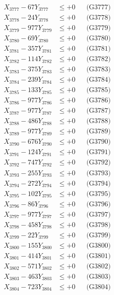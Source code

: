 \documentclass[a4paper,10pt]{article}
\begin{document}
{\begin{align}
X_{3777} - 67Y_{3777} &\leq +0 && \text{(G3777)} \\
X_{3778} - 24Y_{3778} &\leq +0 && \text{(G3778)} \\
X_{3779} - 977Y_{3779} &\leq +0 && \text{(G3779)} \\
X_{3780} - 69Y_{3780} &\leq +0 && \text{(G3780)} \\
\allowbreak
X_{3781} - 357Y_{3781} &\leq +0 && \text{(G3781)} \\
X_{3782} - 114Y_{3782} &\leq +0 && \text{(G3782)} \\
X_{3783} - 375Y_{3783} &\leq +0 && \text{(G3783)} \\
X_{3784} - 239Y_{3784} &\leq +0 && \text{(G3784)} \\
X_{3785} - 133Y_{3785} &\leq +0 && \text{(G3785)} \\
X_{3786} - 977Y_{3786} &\leq +0 && \text{(G3786)} \\
X_{3787} - 977Y_{3787} &\leq +0 && \text{(G3787)} \\
X_{3788} - 486Y_{3788} &\leq +0 && \text{(G3788)} \\
X_{3789} - 977Y_{3789} &\leq +0 && \text{(G3789)} \\
X_{3790} - 676Y_{3790} &\leq +0 && \text{(G3790)} \\
\allowbreak
X_{3791} - 124Y_{3791} &\leq +0 && \text{(G3791)} \\
X_{3792} - 747Y_{3792} &\leq +0 && \text{(G3792)} \\
X_{3793} - 255Y_{3793} &\leq +0 && \text{(G3793)} \\
X_{3794} - 272Y_{3794} &\leq +0 && \text{(G3794)} \\
X_{3795} - 102Y_{3795} &\leq +0 && \text{(G3795)} \\
X_{3796} - 86Y_{3796} &\leq +0 && \text{(G3796)} \\
X_{3797} - 977Y_{3797} &\leq +0 && \text{(G3797)} \\
X_{3798} - 458Y_{3798} &\leq +0 && \text{(G3798)} \\
X_{3799} - 22Y_{3799} &\leq +0 && \text{(G3799)} \\
X_{3800} - 155Y_{3800} &\leq +0 && \text{(G3800)} \\
\allowbreak
X_{3801} - 414Y_{3801} &\leq +0 && \text{(G3801)} \\
X_{3802} - 571Y_{3802} &\leq +0 && \text{(G3802)} \\
X_{3803} - 463Y_{3803} &\leq +0 && \text{(G3803)} \\
X_{3804} - 723Y_{3804} &\leq +0 && \text{(G3804)} \\

\end{align}}
\end{document}
